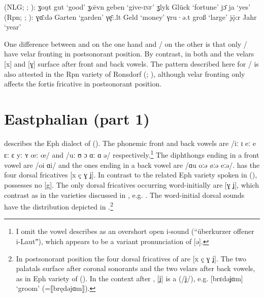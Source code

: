 \ea%
    \label{ex:8:11} (NLG; \citealt{Schönhoff1908}; ):
\ea \label{ex:8:11a}ʓou̯t \tab [ɣout] \tab gut \tab ‘good’ 
\ex \label{ex:8:11b}ʓ\={œ}vn \tab [ɣœːvn̩] \tab geben \tab ‘give\textsc{{}-inf}’ 
\ex \label{ex:8:11c}ʓlyk \tab [ɣlyk] \tab Glück \tab ‘fortune’ 
\ex \label{ex:8:11d}jɔ̄ \tab [ʝɔː] \tab  ja \tab ‘yes’ 
\z
\ex %
\label{ex:8:12} (Rpn; \citealt{Welter1933}; ):
\ea \label{ex:8:12a}ɣɑ̄:də \tab [ɣɑːdə] \tab Garten \tab ‘garden’ 
\ex \label{ex:8:12b}γȩ̄:.lt \tab [ɣɛːlt] \tab Geld \tab ‘money’ 
\ex \label{ex:8:12c}γru·ə.t \tab [ɣruət] \tab groß \tab ‘large’ 
\ex \label{ex:8:12d}jǭ:r \tab [ʝɔːr] \tab Jahr \tab ‘year’ 
\z
\z 

One difference between  and  on the one hand and \slash{} on the other is that only / have velar fronting in postsonorant position. By contrast, in both  and  the velars [x] and [ɣ] surface after front and back vowels. The pattern described here for \slash{} is also attested in the Rpn variety of Ronsdorf (\citealt{Holthaus1887}; ), although velar fronting only affects the fortis fricative in postsonorant position.

\section{{Eastphalian} {(part} {1)}}\label{sec:8.3}

\citet{Block1910} describes the Eph dialect of  (). The phonemic front and back vowels are /iː ɪ eː e ɛː ɛ yː ʏ œː œ/ and /uː ʊ ɔ ɑː ɑ ə/ respectively.\footnote{{I omit the vowel \citet[327]{Block1910} describes as an overshort open i-sound (“überkurzer offener i-Lautˮ), which appears to be a variant pronunciation of [ə].}} The diphthongs ending in a front vowel are /oi ɑi/ and the ones ending in a back vowel are /ɑu oːǝ øːǝ eːǝ/.  has the four dorsal fricatives [x ç ɣ ʝ]. In contrast to the related Eph variety spoken in  (),  possesses no [g]. The only dorsal fricatives occurring word-initially are [ɣ ʝ], which contrast as in the varieties discussed in , e.g. . The word-initial dorsal sounds have the distribution depicted in .\footnote{\label{fn:8:2}In postsonorant position the four dorsal fricatives of  are [x ç ɣ ʝ]. The two palatals surface after coronal sonorants and the two velars after back vowels, as in Eph variety of  (). In the context after , [ʝ] is a  (/ʝ/), e.g. [brɛdəʝɑm] ‘groom’ (=⟦brędəjɑm⟧).}

